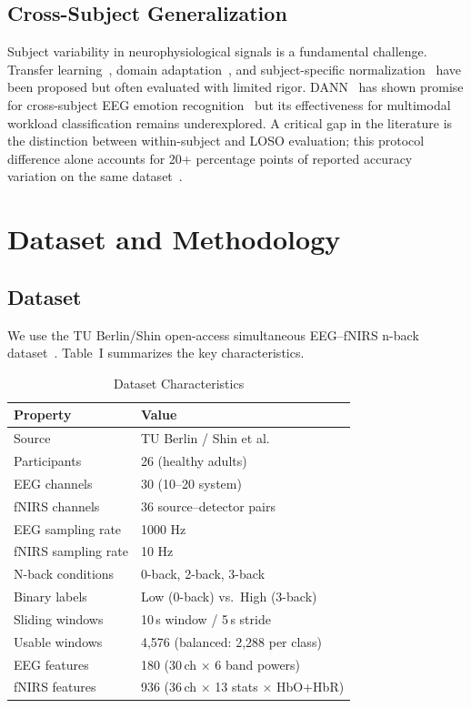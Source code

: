 \documentclass[conference]{IEEEtran}
\begin{document}
\subsection{Cross-Subject Generalization}

Subject variability in neurophysiological signals is a fundamental challenge. Transfer learning~\cite{wu2020transfer}, domain adaptation~\cite{ganin2016domain}, and subject-specific normalization~\cite{shin2018simultaneous} have been proposed but often evaluated with limited rigor. DANN~\cite{ganin2016domain} has shown promise for cross-subject EEG emotion recognition~\cite{li2018cross} but its effectiveness for multimodal workload classification remains underexplored. A critical gap in the literature is the distinction between within-subject and LOSO evaluation; this protocol difference alone accounts for 20+ percentage points of reported accuracy variation on the same dataset~\cite{lotte2018review}.


\section{Dataset and Methodology}

\subsection{Dataset}

We use the TU Berlin/Shin open-access simultaneous EEG--fNIRS n-back dataset~\cite{shin2017open,shin2018simultaneous}. Table~I summarizes the key characteristics.

\begin{table}[t]
\centering
\caption{Dataset Characteristics}
\label{tab:dataset}
\footnotesize
\begin{tabular}{@{}ll@{}}
\toprule
\textbf{Property} & \textbf{Value} \\
\midrule
Source & TU Berlin / Shin et al.\ \cite{shin2017open} \\
Participants & 26 (healthy adults) \\
EEG channels & 30 (10--20 system) \\
fNIRS channels & 36 source--detector pairs \\
EEG sampling rate & 1000 Hz \\
fNIRS sampling rate & 10 Hz \\
N-back conditions & 0-back, 2-back, 3-back \\
Binary labels & Low (0-back) vs.\ High (3-back) \\
Sliding windows & 10\,s window / 5\,s stride \\
Usable windows & 4,576 (balanced: 2,288 per class) \\
EEG features & 180 (30\,ch $\times$ 6 band powers) \\
fNIRS features & 936 (36\,ch $\times$ 13 stats $\times$ HbO+HbR) \\
\bottomrule
\end{tabular}
\end{table}
\end{document}
